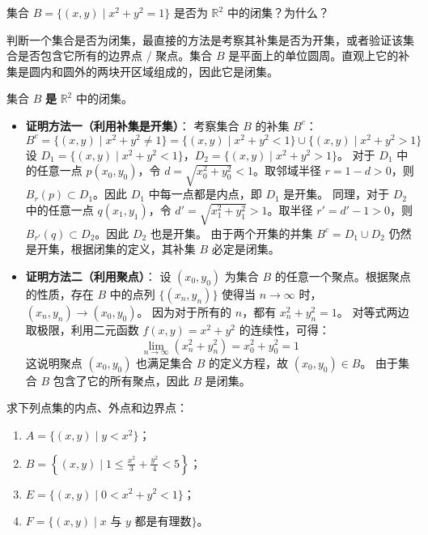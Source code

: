 \documentclass[lang=cn,11pt]{elegantbook}
\begin{document}
\begin{exercise}[闭集的判定]
集合 $B=\{(x,y) \mid x^2+y^2=1\}$ 是否为 $\mathbb{R}^2$ 中的闭集？为什么？
\end{exercise}
\begin{note}
判断一个集合是否为闭集，最直接的方法是考察其补集是否为开集，或者验证该集合是否包含它所有的边界点 / 聚点。集合 $B$ 是平面上的单位圆周。直观上它的补集是圆内和圆外的两块开区域组成的，因此它是闭集。
\end{note}
\begin{solution}
集合 $B$ \textbf{是} $\mathbb{R}^2$ 中的闭集。
\begin{itemize}
\item \textbf{证明方法一（利用补集是开集）}：
考察集合 $B$ 的补集 $B^c$：
\[
B^c = \{(x,y) \mid x^2+y^2 \neq 1\} = \{(x,y) \mid x^2+y^2 < 1\} \cup \{(x,y) \mid x^2+y^2 > 1\}
\]
设 $D_1 = \{(x,y) \mid x^2+y^2 < 1\}$，$D_2 = \{(x,y) \mid x^2+y^2 > 1\}$。
对于 $D_1$ 中的任意一点 $p(x_0, y_0)$，令 $d = \sqrt{x_0^2+y_0^2} < 1$。取邻域半径 $r = 1 - d > 0$，则 $B_r(p) \subset D_1$。因此 $D_1$ 中每一点都是内点，即 $D_1$ 是开集。
同理，对于 $D_2$ 中的任意一点 $q(x_1, y_1)$，令 $d' = \sqrt{x_1^2+y_1^2} > 1$。取半径 $r' = d' - 1 > 0$，则 $B_{r'}(q) \subset D_2$。因此 $D_2$ 也是开集。
由于两个开集的并集 $B^c = D_1 \cup D_2$ 仍然是开集，根据闭集的定义，其补集 $B$ 必定是闭集。
\item \textbf{证明方法二（利用聚点）}：
设 $(x_0, y_0)$ 为集合 $B$ 的任意一个聚点。根据聚点的性质，存在 $B$ 中的点列 $\{(x_n, y_n)\}$ 使得当 $n \to \infty$ 时，$(x_n, y_n) \to (x_0, y_0)$。
因为对于所有的 $n$，都有 $x_n^2 + y_n^2 = 1$。
对等式两边取极限，利用二元函数 $f(x,y) = x^2+y^2$ 的连续性，可得：
\[
\lim_{n \to \infty} (x_n^2 + y_n^2) = x_0^2 + y_0^2 = 1
\]
这说明聚点 $(x_0, y_0)$ 也满足集合 $B$ 的定义方程，故 $(x_0, y_0) \in B$。
由于集合 $B$ 包含了它的所有聚点，因此 $B$ 是闭集。
\end{itemize}
\end{solution}

\begin{exercise}[点集拓扑基本概念的计算]
求下列点集的内点、外点和边界点：
\begin{enumerate}
  \item[(1)] $A=\{(x,y) \mid y < x^2\}$；
  \item[(2)] $B=\left\{(x,y) \mid 1 \leqslant  \frac{x^2}{3} + \frac{y^2}{4} < 5\right\}$；
  \item[(3)] $E=\{(x,y) \mid 0 < x^2+y^2 < 1\}$；
  \item[(4)] $F=\{(x,y) \mid x \text{ 与 } y \text{ 都是有理数}\}$。
\end{enumerate}
\end{exercise}
\end{document}
